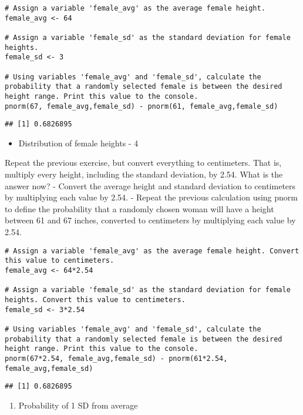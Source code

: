 \documentclass[
]{article}
\providecommand{\tightlist}{%
  \setlength{\itemsep}{0pt}\setlength{\parskip}{0pt}}
\begin{document}
\begin{verbatim}
# Assign a variable 'female_avg' as the average female height.
female_avg <- 64

# Assign a variable 'female_sd' as the standard deviation for female heights.
female_sd <- 3

# Using variables 'female_avg' and 'female_sd', calculate the probability that a randomly selected female is between the desired height range. Print this value to the console.
pnorm(67, female_avg,female_sd) - pnorm(61, female_avg,female_sd)
\end{verbatim}

\begin{verbatim}
## [1] 0.6826895
\end{verbatim}

\begin{itemize}
\tightlist
\item
  Distribution of female heights - 4
\end{itemize}

Repeat the previous exercise, but convert everything to centimeters.
That is, multiply every height, including the standard deviation, by
2.54. What is the answer now? - Convert the average height and standard
deviation to centimeters by multiplying each value by 2.54. - Repeat the
previous calculation using pnorm to define the probability that a
randomly chosen woman will have a height between 61 and 67 inches,
converted to centimeters by multiplying each value by 2.54.

\begin{verbatim}
# Assign a variable 'female_avg' as the average female height. Convert this value to centimeters.
female_avg <- 64*2.54

# Assign a variable 'female_sd' as the standard deviation for female heights. Convert this value to centimeters.
female_sd <- 3*2.54

# Using variables 'female_avg' and 'female_sd', calculate the probability that a randomly selected female is between the desired height range. Print this value to the console.
pnorm(67*2.54, female_avg,female_sd) - pnorm(61*2.54, female_avg,female_sd)
\end{verbatim}

\begin{verbatim}
## [1] 0.6826895
\end{verbatim}

\begin{enumerate}
\def\labelenumi{\arabic{enumi}.}
\setcounter{enumi}{4}
\tightlist
\item
  Probability of 1 SD from average
\end{enumerate}
\end{document}
